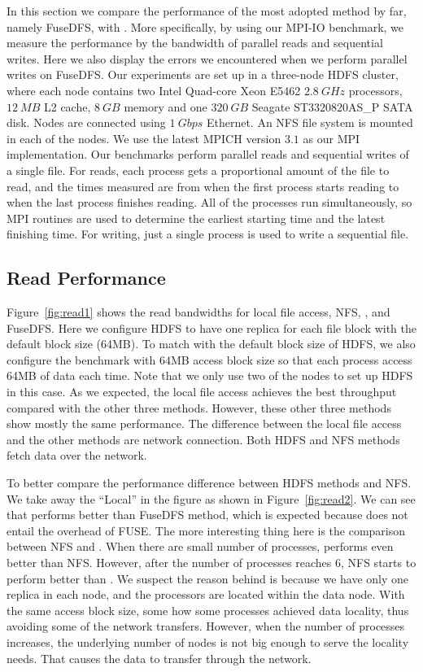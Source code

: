 In this section we compare the performance of the most adopted method by far,
namely FuseDFS, with {\proj}. More specifically, by using our MPI-IO benchmark,
we measure the performance by the bandwidth of parallel reads and sequential
writes. Here we also display the errors we encountered when we perform parallel
writes on FuseDFS. Our experiments are set up in a three-node HDFS cluster,
where each node contains two Intel Quad-core Xeon E5462 $2.8~GHz$ processors,
$12~MB$ L2 cache, $8~GB$ memory and one $320~GB$ Seagate ST3320820AS\_P SATA
disk. Nodes are connected using $1~Gbps$ Ethernet. An NFS file system is mounted
in each of the nodes. We use the latest MPICH
version $3.1$ as our MPI implementation. Our benchmarks perform parallel reads
and sequential writes of a single file. For reads, each process gets a proportional
amount of the file to read, and the times measured are from when the first process
starts reading to when the last process finishes reading. All of the processes run
simultaneously, so MPI routines are used to determine the earliest starting time
and the latest finishing time. For writing, just a single process is used to
write a sequential file.

\subsection{Read Performance}
Figure~\ref{fig:read1} shows the read bandwidths for local file access, NFS, {\proj},
and FuseDFS. Here we configure HDFS to have one replica for each file block with
the default block size (64MB). To match with the default block size of HDFS, we
also configure the benchmark with 64MB access block size so that each process
access 64MB of data each time. Note that we only use two of the nodes to set up
HDFS in this case. As we expected, the local file access achieves
the best throughput compared with the other three methods. However, these other three
methods show mostly the same performance. The
difference between the local file access and the other methods are network
connection. Both HDFS and NFS methods fetch data over the network.

To better compare the performance difference between HDFS methods and NFS. We
take away the ``Local'' in the figure as shown in Figure~\ref{fig:read2}. We 
can see that {\proj} performs better than FuseDFS method, which is expected
because {\proj} does not entail the overhead of FUSE. The more interesting thing
here is the comparison between NFS and {\proj}. When there are small
number of processes, {\proj} performs even better than NFS. However, after the
number of processes reaches 6, NFS starts to perform better than {\proj}. We
suspect the reason behind is because we have only one replica in each node, and
the processors are located within the data node. With the same access block
size, some how some processes achieved data locality, thus avoiding some of the
network transfers. However, when the number of processes increases, the
underlying number of nodes is not big enough to serve the locality needs. That
causes the data to transfer through the network.

